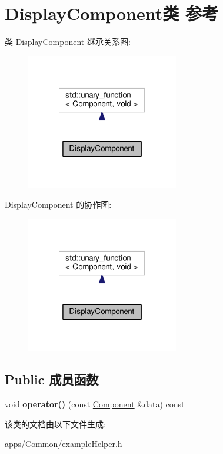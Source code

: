\hypertarget{class_display_component}{\section{Display\+Component类 参考}
\label{class_display_component}
}


类 Display\+Component 继承关系图\+:
\nopagebreak
\begin{figure}[H]
\begin{center}
\leavevmode
\includegraphics[width=188pt]{class_display_component__inherit__graph}
\end{center}
\end{figure}


Display\+Component 的协作图\+:
\nopagebreak
\begin{figure}[H]
\begin{center}
\leavevmode
\includegraphics[width=188pt]{class_display_component__coll__graph}
\end{center}
\end{figure}
\subsection*{Public 成员函数}
\begin{DoxyCompactItemize}
\item 
\hypertarget{class_display_component_a45f1b30e27687f4f702ae521a682ca79}{void {\bfseries operator()} (const \hyperlink{classmv_i_m_p_a_c_t_1_1acquire_1_1_component}{Component} \&data) const }\label{class_display_component_a45f1b30e27687f4f702ae521a682ca79}

\end{DoxyCompactItemize}


该类的文档由以下文件生成\+:\begin{DoxyCompactItemize}
\item 
apps/\+Common/example\+Helper.\+h\end{DoxyCompactItemize}
